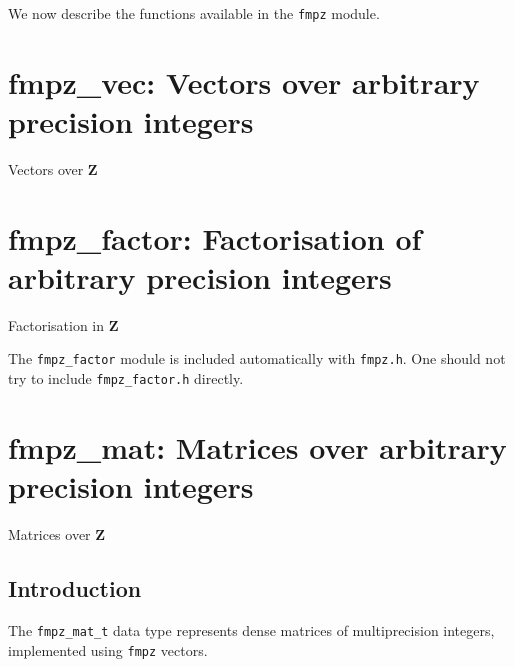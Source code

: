 \documentclass[a4paper,10pt]{book}
\newcommand{\Z}{\mathbf{Z}}%
\newcommand{\code}{\lstinline}
\begin{document}
{{We now describe the functions available in the \code{fmpz} module.




\chapter{fmpz\_vec: Vectors over arbitrary precision integers}
\epigraph{Vectors over $\Z$}{}




\chapter{fmpz\_factor: Factorisation of arbitrary precision integers}
\epigraph{Factorisation in $\Z$}{}

The \code{fmpz_factor} module is included automatically with
\code{fmpz.h}. One should not try to include \code{fmpz_factor.h}
directly.




\chapter{fmpz\_mat: Matrices over arbitrary precision integers}
\epigraph{Matrices over $\Z$}{}

\section{Introduction}

The \code{fmpz_mat_t} data type represents dense matrices of multiprecision
integers, implemented using \code{fmpz} vectors.

}}
\end{document}
